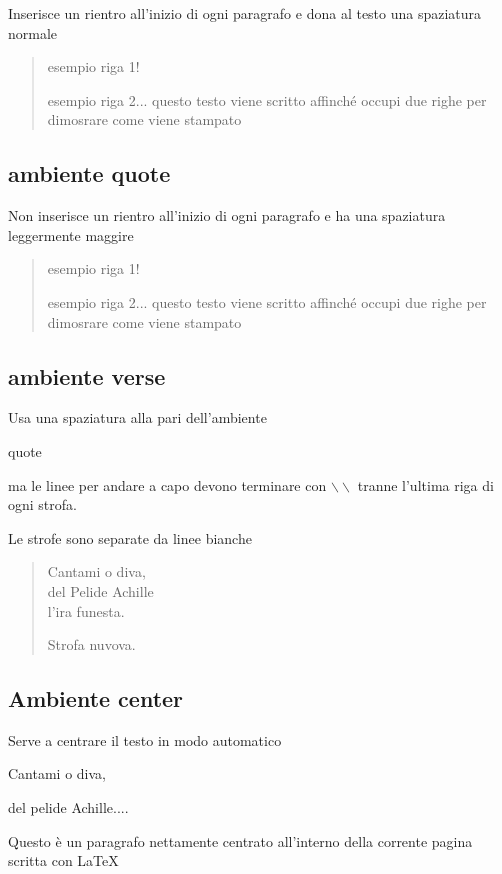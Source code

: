 \documentclass{article}
\begin{document}
Inserisce un rientro all'inizio di ogni paragrafo e dona al testo una spaziatura normale

\begin{quotation}
esempio riga 1!

esempio riga 2... questo testo viene scritto affinché occupi due righe per dimosrare come viene stampato
\end{quotation}

\subsection{ambiente quote}

Non inserisce un rientro all'inizio di ogni paragrafo e ha una spaziatura leggermente maggire

\begin{quote}
esempio riga 1!

esempio riga 2... questo testo viene scritto affinché occupi due righe per dimosrare come viene stampato
\end{quote}

\subsection{ambiente verse}

Usa una spaziatura alla pari dell'ambiente
\begin{em}
quote
\end{em}
ma le linee per andare a capo devono terminare con $\backslash \backslash$ tranne l'ultima riga di ogni strofa.

Le strofe sono separate da linee bianche

\begin{verse}
Cantami o diva, \\
del Pelide Achille \\
l'ira funesta.

Strofa nuvova.
\end{verse}

\subsection{Ambiente center}

Serve a centrare il testo in modo automatico

\begin{center}
Cantami o diva,

del pelide Achille....

Questo è un paragrafo nettamente centrato all'interno della corrente pagina scritta con \LaTeX
\end{center}
\end{document}
